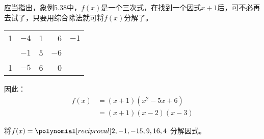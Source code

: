 应当指出，象例5.38中，$f(x)$是一个三次式，在找到一个因式$x+1$后，可不必再去试了，只要用综合除法就可将$f(x)$分解了。
\begin{center}
\begin{tabular}{rrrr|r}
    1 &$-4$&1&6  &$-1$\\
    \cline{5-5}
    & $-1$ & 5& $-6$\\
    \cline{1-4}
    1&$-5$ & 6&0\\
\end{tabular}    
\end{center}
因此：
\[\begin{split}
    f(x)&=(x+1)(x^2-5x+6)\\
    &=(x+1)(x-2)(x-3)
\end{split}\]

\begin{example}
    将$f(x)=\poly{2,-1,-15,9,16,4}$ 分解因式。
\end{example}



